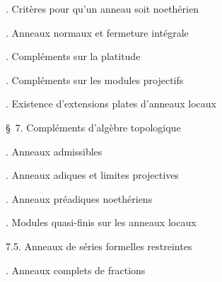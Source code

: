 \noindent{}. Critères pour qu'un anneau soit noethérien\dotfill

\noindent{}. Anneaux normaux et fermeture intégrale\dotfill
{}

\noindent{}. Compléments sur la platitude\dotfill

\noindent{}. Compléments sur les modules projectifs\dotfill

\noindent{}. Existence d'extensions plates d'anneaux locaux\dotfill

\noindent\quad {}

\noindent\quad \S\ 7. Compléments d'algèbre topologique\dotfill

\noindent{}. Anneaux admissibles\dotfill

\noindent{}. Anneaux adiques et limites projectives\dotfill

\noindent{}. Anneaux préadiques noethériens\dotfill

\noindent{}. Modules quasi-finis sur les anneaux locaux\dotfill

\noindent\qquad {} 7.5. Anneaux de séries formelles restreintes\dotfill

\noindent{}. Anneaux complets de fractions\dotfill

